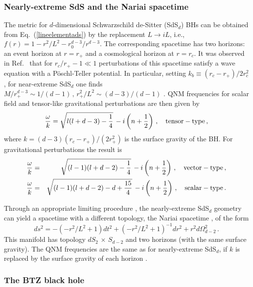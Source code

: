 \documentclass[]{iopart}
\def\be{\begin{equation}}
\def\ee{\end{equation}}
\def\beq{\begin{eqnarray}}
\def\eeq{\end{eqnarray}}
\def\f{\frac}
\def\nn{\nonumber}
\def\f{\frac}
\begin{document}
\subsubsection*{Nearly-extreme SdS and the Nariai spacetime}
%
The metric for $d$-dimensional Schwarzschild de-Sitter (SdS$_d$) BHs can be
obtained from Eq.~(\ref{lineelementads}) by the replacement $L\to iL$, i.e.,
$f(r) = 1 - r^2/L^2 - r_0^{d-3}/r^{d-3}$.  The corresponding spacetime has two
horizons: an event horizon at $r=r_+$ and a cosmological horizon at
$r=r_c$. It was observed in Ref.~\cite{Cardoso:2004uz} that for $r_c/r_+-1\ll
1$ perturbations of this spacetime satisfy a wave equation with a
P\"oschl-Teller potential. In particular, setting $k_b \equiv
(r_c-r_+)/2r_c^2$, for near-extreme SdS$_d$ one finds $M/r_+^{d-3}\sim
1/(d-1)\,,\,r_+^2/L^2\sim (d-3)/(d-1)$ \cite{Cardoso:2004uz,Molina:2003ff}.
QNM frequencies for scalar field and tensor-like gravitational perturbations
are then given by \cite{Cardoso:2004uz,Molina:2003ff}
%
\be 
\f{\omega}{k}=\sqrt{l(l+d-3)-\f{1}{4}}\,-i\left
(n+\f{1}{2}\right )\,,
\quad {\rm tensor-type}
\,,\ee
%
where $k=(d-3)(r_c-r_+)/(2r_+^2)$ is the surface gravity of the
BH. For gravitational perturbations the result is
%
\beq
\f{\omega}{k}&=&\sqrt{(l-1)(l+d-2)-\f{1}{4}}\,-i\left
(n+\f{1}{2}\right )\,,
\quad {\rm vector-type}\,,\\
\nn
\f{\omega}{k}&=&\sqrt{(l-1)(l+d-2)-d+\f{15}{4}}\,-i\left
(n+\f{1}{2}\right )\,,
\quad {\rm scalar-type}\,. 
\eeq
%

Through an appropriate limiting procedure \cite{Cardoso:2004uz,Vanzo:2004fy},
the nearly-extreme SdS$_d$ geometry can yield a spacetime with a different
topology, the Nariai spacetime
\cite{Cardoso:2004uz,Nariai1,Nariai2,Caldarelli:2000wc}, of the form
%
\be ds^2=-\left (-r^2/L^2+1\right )dt^2 +\left
(-r^2/L^2+1\right )^{-1}
dr^2+r^2d\Omega_{d-2}^2\,.
\ee
%
This manifold has topology $dS_2\,\times \,S_{d-2}$ and two horizons (with the
same surface gravity). The QNM frequencies are the same as for nearly-extreme
SdS$_d$, if $k$ is replaced by the surface gravity of each horizon
\cite{Vanzo:2004fy}.

\subsubsection*{The BTZ black hole}
\end{document}

